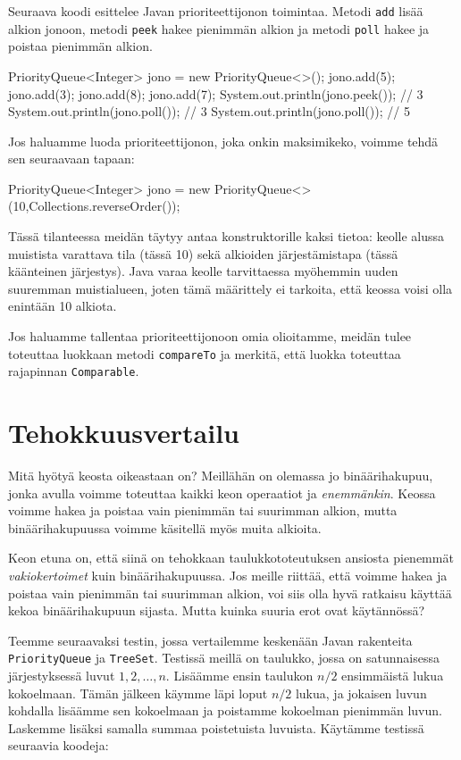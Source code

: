 Seuraava koodi esittelee Javan prioriteettijonon toimintaa.
Metodi \texttt{add} lisää alkion jonoon,
metodi \texttt{peek} hakee pienimmän alkion
ja metodi \texttt{poll} hakee ja poistaa pienimmän alkion.

\begin{code}
PriorityQueue<Integer> jono = new PriorityQueue<>();
jono.add(5);
jono.add(3);
jono.add(8);
jono.add(7);
System.out.println(jono.peek()); // 3
System.out.println(jono.poll()); // 3
System.out.println(jono.poll()); // 5
\end{code}

Jos haluamme luoda prioriteettijonon, joka onkin
maksimikeko, voimme tehdä sen seuraavaan tapaan:

\begin{code}
PriorityQueue<Integer> jono =
    new PriorityQueue<>(10,Collections.reverseOrder());
\end{code}

Tässä tilanteessa meidän täytyy antaa konstruktorille kaksi tietoa:
keolle alussa muistista varattava tila (tässä 10)
sekä alkioiden järjestämistapa (tässä käänteinen järjestys).
Java varaa keolle tarvittaessa myöhemmin uuden suuremman muistialueen,
joten tämä määrittely ei tarkoita, että keossa voisi olla enintään 10 alkiota.

Jos haluamme tallentaa prioriteettijonoon omia olioitamme,
meidän tulee toteuttaa luokkaan metodi \texttt{compareTo} ja
merkitä, että luokka toteuttaa rajapinnan \texttt{Comparable}.

\section{Tehokkuusvertailu}

Mitä hyötyä keosta oikeastaan on?
Meillähän on olemassa jo binäärihakupuu,
jonka avulla voimme toteuttaa kaikki keon operaatiot
ja \emph{enemmänkin}.
Keossa voimme hakea ja poistaa vain pienimmän tai suurimman alkion,
mutta binäärihakupuussa voimme käsitellä myös muita alkioita.

Keon etuna on, että siinä on tehokkaan taulukkototeutuksen
ansiosta pienemmät \emph{vakiokertoimet} kuin binäärihakupuussa.
Jos meille riittää, että voimme hakea ja poistaa
vain pienimmän tai suurimman alkion, voi siis olla hyvä
ratkaisu käyttää kekoa binäärihakupuun sijasta.
Mutta kuinka suuria erot ovat käytännössä?

Teemme seuraavaksi testin, jossa vertailemme keskenään
Javan rakenteita
\texttt{PriorityQueue} ja \texttt{TreeSet}.
Testissä meillä on taulukko,
jossa on satunnaisessa järjestyksessä luvut $1,2,\dots,n$.
Lisäämme ensin taulukon $n/2$ ensimmäistä lukua kokoelmaan.
Tämän jälkeen käymme läpi loput $n/2$ lukua,
ja jokaisen luvun kohdalla lisäämme sen kokoelmaan ja
poistamme kokoelman pienimmän luvun.
Laskemme lisäksi samalla summaa poistetuista luvuista.
Käytämme testissä seuraavia koodeja:

